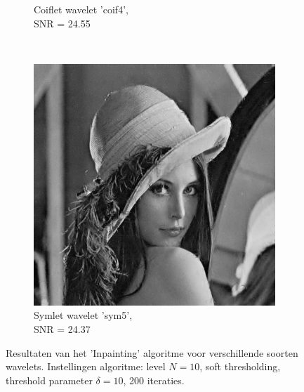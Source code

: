 \begin{figure}
\begin{subfigure}[b]{0.4\textwidth}
        \caption{Coiflet wavelet 'coif4', \\ SNR = 24.55 }
        \label{fig:matti_fig_coif4}
    \end{subfigure}
    ~ %
    \begin{subfigure}[b]{0.4\textwidth}
        \includegraphics[width=\textwidth]{../src/inpainting/vraag_2_4_sym5}
        \caption{ Symlet wavelet 'sym5', \\ SNR = 24.37 }
        \label{fig:matti_fig_sym5}
    \end{subfigure}
    \caption{Resultaten van het 'Inpainting' algoritme voor verschillende soorten wavelets. Instellingen algoritme: level $N = 10$, soft thresholding, threshold parameter $\delta = 10$, 200 iteraties.}\label{fig:matti_fig_5}
\end{figure}




